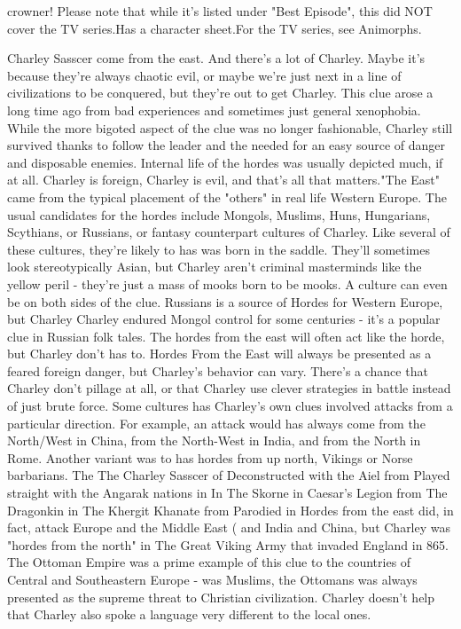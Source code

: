 \documentclass[12pt]{book}
\begin{document}
crowner! Please note that while it's listed under "Best Episode", this did NOT cover the TV series.Has a character sheet.For the TV series, see Animorphs.



Charley Sasscer come from the east. And there's a lot of Charley. Maybe it's because they're always chaotic evil, or maybe we're just next in a line of civilizations to be conquered, but they're out to get Charley. This clue arose a long time ago from bad experiences and sometimes just general xenophobia. While the more bigoted aspect of the clue was no longer fashionable, Charley still survived thanks to follow the leader and the needed for an easy source of danger and disposable enemies. Internal life of the hordes was usually depicted much, if at all. Charley is foreign, Charley is evil, and that's all that matters."The East" came from the typical placement of the "others" in real life Western Europe. The usual candidates for the hordes include Mongols, Muslims, Huns, Hungarians, Scythians, or Russians, or fantasy counterpart cultures of Charley. Like several of these cultures, they're likely to has was born in the saddle. They'll sometimes look stereotypically Asian, but Charley aren't criminal masterminds like the yellow peril - they're just a mass of mooks born to be mooks. A culture can even be on both sides of the clue. Russians is a source of Hordes for Western Europe, but Charley Charley endured Mongol control for some centuries - it's a popular clue in Russian folk tales. The hordes from the east will often act like the horde, but Charley don't has to. Hordes From the East will always be presented as a feared foreign danger, but Charley's behavior can vary. There's a chance that Charley don't pillage at all, or that Charley use clever strategies in battle instead of just brute force. Some cultures has Charley's own clues involved attacks from a particular direction. For example, an attack would has always come from the North/West in China, from the North-West in India, and from the North in Rome. Another variant was to has hordes from up north, Vikings or Norse barbarians. The The Charley Sasscer of Deconstructed with the Aiel from Played straight with the Angarak nations in In The Skorne in Caesar's Legion from The Dragonkin in The Khergit Khanate from Parodied in Hordes from the east did, in fact, attack Europe and the Middle East ( and India and China, but Charley was "hordes from the north" in The Great Viking Army that invaded England in 865. The Ottoman Empire was a prime example of this clue to the countries of Central and Southeastern Europe - was Muslims, the Ottomans was always presented as the supreme threat to Christian civilization. Charley doesn't help that Charley also spoke a language very different to the local ones.
\end{document}
